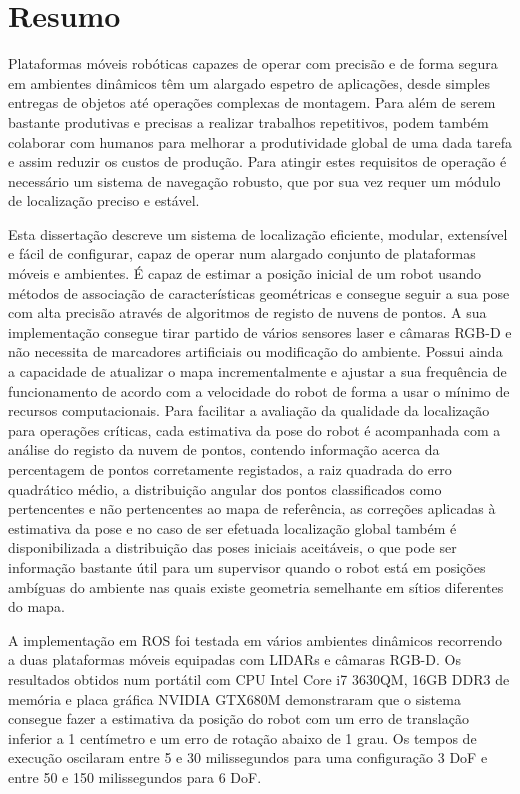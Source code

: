 \chapter*{Resumo}

Plataformas móveis robóticas capazes de operar com precisão e de forma segura em ambientes dinâmicos têm um alargado espetro de aplicações, desde simples entregas de objetos até operações complexas de montagem. Para além de serem bastante produtivas e precisas a realizar trabalhos repetitivos, podem também colaborar com humanos para melhorar a produtividade global de uma dada tarefa e assim reduzir os custos de produção. Para atingir estes requisitos de operação é necessário um sistema de navegação robusto, que por sua vez requer um módulo de localização preciso e estável.

Esta dissertação descreve um sistema de localização eficiente, modular, extensível e fácil de configurar, capaz de operar num alargado conjunto de plataformas móveis e ambientes. É capaz de estimar a posição inicial de um robot usando métodos de associação de características geométricas e consegue seguir a sua pose com alta precisão através de algoritmos de registo de nuvens de pontos. A sua implementação consegue tirar partido de vários sensores laser e câmaras RGB-D e não necessita de marcadores artificiais ou modificação do ambiente. Possui ainda a capacidade de atualizar o mapa incrementalmente e ajustar a sua frequência de funcionamento de acordo com a velocidade do robot de forma a usar o mínimo de recursos computacionais. Para facilitar a avaliação da qualidade da localização para operações críticas, cada estimativa da pose do robot é acompanhada com a análise do registo da nuvem de pontos, contendo informação acerca da percentagem de pontos corretamente registados, a raiz quadrada do erro quadrático médio, a distribuição angular dos pontos classificados como pertencentes e não pertencentes ao mapa de referência, as correções aplicadas à estimativa da pose e no caso de ser efetuada localização global também é disponibilizada a distribuição das poses iniciais aceitáveis, o que pode ser informação bastante útil para um supervisor quando o robot está em posições ambíguas do ambiente nas quais existe geometria semelhante em sítios diferentes do mapa.

A implementação em ROS foi testada em vários ambientes dinâmicos recorrendo a duas plataformas móveis equipadas com LIDARs e câmaras RGB-D. Os resultados obtidos num portátil com CPU Intel Core i7 3630QM, 16GB DDR3 de memória e placa gráfica NVIDIA GTX680M demonstraram que o sistema consegue fazer a estimativa da posição do robot com um erro de translação inferior a 1 centímetro e um erro de rotação abaixo de 1 grau. Os tempos de execução oscilaram entre 5 e 30 milissegundos para uma configuração 3 DoF e entre 50 e 150 milissegundos para 6 DoF.
